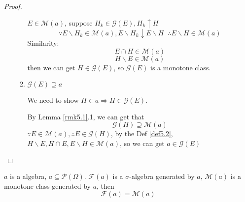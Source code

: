 \begin{proof}
\begin{enumerate}
\begin{enumerate}
			$ E \in \mathcal{M}(a) $, suppose ${H_k} \in \mathcal{G}\left( E \right),{H_k} \uparrow H$
			\begin{equation}
			\because E\backslash {H_k} \in \mathcal{M}\left( a \right),E\backslash {H_k} \downarrow E\backslash H\;\;\therefore E\backslash H \in \mathcal{M}\left( a \right)
			\label{eq5.7}
			\end{equation}
			Similarity:
			\begin{equation}
			E \cap H \in \mathcal{M}\left( a \right)
			\label{eq5.8}
			\end{equation}
			\begin{equation}
			H\backslash E \in \mathcal{M}\left( a \right)
			\label{eq5.9}
			\end{equation}
			then we can get $H \in \mathcal{G}\left( E \right)$, so $ \mathcal{G}\left( E \right) $ is a monotone class.
			\item $ \mathcal{G}(E) \supseteq a $ 
			
		     We need to show $ H \in a \Rightarrow H \in \mathcal{G}(E) $.
		     
		     By Lemma \ref{rmk5.1}.1, we can get that
		     \begin{equation}
		     \mathcal{G}(H) \supseteq \mathcal{M}(a)
		     \label{eq5.10}
		     \end{equation}
		     $ \because E \in \mathcal{M}(a), \therefore E \in \mathcal{G}(H) $, by the Def \ref{def5.2}, $H\backslash E,H \cap E,E\backslash H \in \mathcal{M}\left( a \right)$, so we can get  $ a \in \mathcal{G}\left( E \right) $
		\end{enumerate}
	\end{enumerate}
\end{proof}

\begin{theorem}
	$ a $ is a algebra, $ a \subseteq \mathcal{P}(\Omega) $.
	$ \mathcal{F}(a) $ is a $ \sigma $-algebra generated by $ a $, $ \mathcal{M}(a)  $ is a monotone class generated by $ a $, then
	\begin{equation}
	\mathcal{F}(a) =  \mathcal{M}(a)
	\label{eq5.11}
	\end{equation}
	\label{thm5.1}
\end{theorem}

